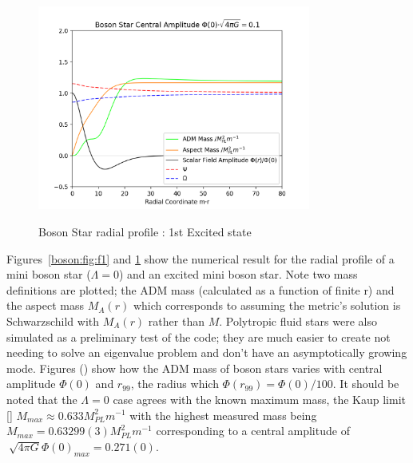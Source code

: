   \begin{figure}[h!]
  \caption{Boson Star radial profile : 1st Excited state}
  \centering
  \includegraphics[width=0.8\textwidth]{png/bosonstar_excitedstate.png}\label{boson:fig:f2}
\end{figure}

Figures~\ref{boson:fig:f1} and \ref{boson:fig:f2} show the numerical result for the radial profile of a mini boson star ($\Lambda=0$) and an excited mini boson star. Note two mass definitions are plotted; the ADM mass (calculated as a function of finite r) and the aspect mass $M_A(r)$ which corresponds to assuming the metric's solution is Schwarzschild with $M_A(r)$ rather than $M$. Polytropic fluid stars were also simulated as a preliminary test of the code; they are much easier to create not needing to solve an eigenvalue problem and don't have an asymptotically growing mode. Figures () show how the ADM mass of boson stars varies with central amplitude $\Phi(0)$ and $r_{99}$, the radius which $\Phi(r_{99}) = \Phi(0)/100$. It should be noted that the $\Lambda =0$ case agrees with the known maximum mass, the Kaup limit [] $M_{max} \approx 0.633 {M_{PL}^2}{m^{-1}}$ with the highest measured mass being $ M_{max} = 0.63299(3) {M_{PL}^2}{m^{-1}} $ corresponding to a central amplitude of $\ \sqrt{4\pi G}\Phi(0)_{max} = 0.271(0)$. 


